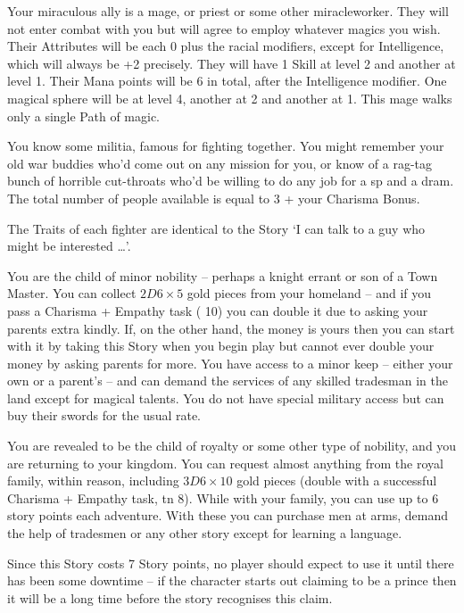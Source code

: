 \begin{multicols}{2}
Your miraculous ally is a mage, or priest or some other \gls{miracleworker}. They will not enter combat with you but will agree to employ whatever magics you wish. Their Attributes will be each 0 plus the racial modifiers, except for Intelligence, which will always be +2 precisely. They will have 1 Skill at level 2 and another at level 1. Their Mana points will be 6 in total, after the Intelligence modifier. One magical sphere will be at level 4, another at 2 and another at 1. This mage walks only a single Path of magic.

You know some militia, famous for fighting together. You might remember your old war buddies who'd come out on any mission for you, or know of a rag-tag bunch of horrible cut-throats who'd be willing to do any job for a \gls{sp} and a dram. The total number of people available is equal to 3 + your Charisma Bonus.

The Traits of each fighter are identical to the Story `I can talk to a guy who might be interested {\dots}'.

You are the child of minor nobility -- perhaps a knight errant or son of a Town Master.
You can collect $2D6 \times 5$ gold pieces from your homeland -- and if you pass a Charisma + Empathy task ( 10) you can double it due to asking your parents extra kindly.
If, on the other hand, the money is yours then you can start with it by taking this Story when you begin play but cannot ever double your money by asking parents for more.
You have access to a minor keep -- either your own or a parent's -- and can demand the services of any skilled tradesman in the land except for magical talents.
You do not have special military access but can buy their swords for the usual rate.

You are revealed to be the child of royalty or some other type of nobility, and you are returning to your kingdom. You can request almost anything from the royal family, within reason, including $3D6 \times 10$ gold pieces (double with a successful Charisma + Empathy task, \gls{tn} 8). While with your family, you can use up to 6 story points each adventure. With these you can purchase men at arms, demand the help of tradesmen or any other story except for learning a language.

Since this Story costs 7 Story points, no player should expect to use it until there has been some downtime -- if the character starts out claiming to be a prince then it will be a long time before the story recognises this claim.

\end{multicols}

